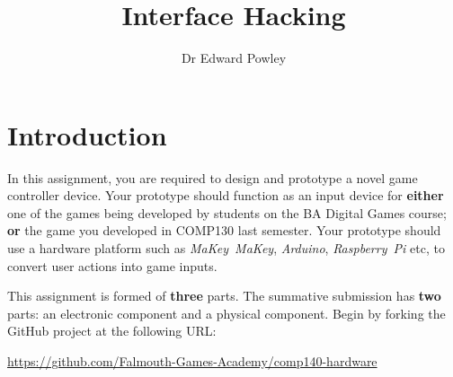 \documentclass{../fal_assignment}
\title{Interface Hacking}
\author{Dr Edward Powley}
\begin{document}
\maketitle
%    
\section*{Introduction}

In this assignment, you are required to design and prototype a novel game controller device.
Your prototype should function as an input device for \textbf{either}
one of the games being developed by students on the BA Digital Games course; \textbf{or}
the game you developed in COMP130 last semester.
Your prototype should use a hardware platform such as \emph{MaKey~MaKey}, \emph{Arduino}, \emph{Raspberry~Pi} etc,
to convert user actions into game inputs.


This assignment is formed of \textbf{three} parts.
The summative submission has \textbf{two} parts: an electronic component and a physical component.
Begin by forking the GitHub project at the following URL:
\begin{center}
\url{https://github.com/Falmouth-Games-Academy/comp140-hardware}
\end{center}
\end{document}
